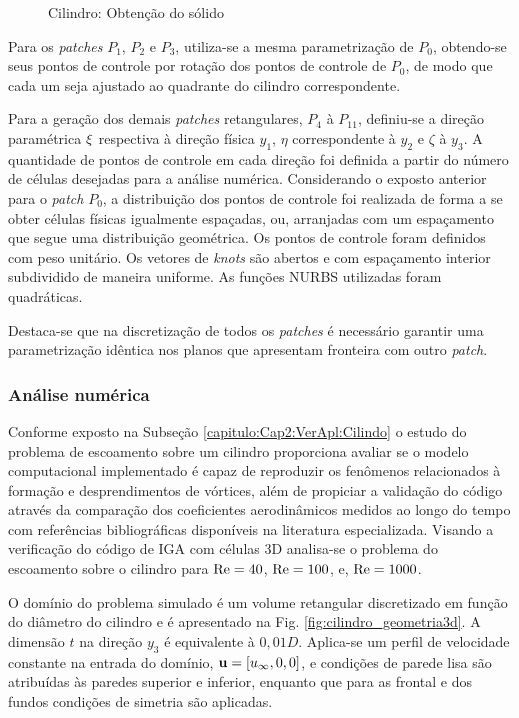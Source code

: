 \documentclass[tese_patricia]{subfiles}
\begin{document}
\begin{figure}[!t]
	\caption{Cilindro: Obtenção do sólido}
	\label{fig:cilindro_geo2}
\end{figure}

Para os \textit{patches} $P_1$, $P_2$ e $P_3$, utiliza-se a mesma parametrização de $P_0$, obtendo-se seus pontos de controle por rotação dos pontos de controle de $P_0$, de modo que cada um seja ajustado ao quadrante do cilindro correspondente.

Para a geração dos demais \textit{patches} retangulares, $P_4$ à $P_{11}$, definiu-se a direção paramétrica $\xi$ respectiva à direção física $y_1$, $\eta$ correspondente à $y_2$ e $\zeta$ à $y_3$. A quantidade de pontos de controle em cada direção foi definida a partir do número de células desejadas para a análise numérica. Considerando o exposto anterior para o \textit{patch} $P_0$, a distribuição dos pontos de controle foi realizada de forma a se obter células físicas igualmente espaçadas, ou, arranjadas com um espaçamento que segue uma distribuição geométrica. Os pontos de controle foram definidos com peso unitário. Os vetores de \textit{knots} são abertos e com espaçamento interior subdividido de maneira uniforme. As funções NURBS utilizadas foram quadráticas. 

Destaca-se que na discretização de todos os \textit{patches} é necessário garantir uma parametrização idêntica nos planos que apresentam fronteira com outro \textit{patch}.


\subsubsection {Análise numérica}

Conforme exposto na Subseção \ref{capitulo:Cap2:VerApl:Cilindo} o estudo do problema de escoamento sobre um cilindro proporciona avaliar se o modelo computacional implementado é capaz de reproduzir os fenômenos relacionados à formação e desprendimentos de vórtices, além de propiciar a validação do código através da comparação dos coeficientes aerodinâmicos medidos ao longo do tempo com referências bibliográficas disponíveis na literatura especializada. Visando a verificação do código de IGA com células 3D analisa-se o problema do escoamento sobre o cilindro para $\mathrm{Re} = 40$, $\mathrm{Re} = 100$, e, $\mathrm{Re} = 1000$.

O domínio do problema simulado é um volume retangular discretizado em função do diâmetro do cilindro e é apresentado na Fig. \ref{fig:cilindro_geometria3d}. A dimensão $t$ na direção $y_3$ é equivalente à $0,01D$. Aplica-se um perfil de velocidade constante na entrada do domínio, $\mathbf{u}=[u_\infty,0,0]$, e condições de parede lisa são atribuídas às paredes superior e inferior, enquanto que para as frontal e dos fundos condições de simetria são aplicadas.
\end{document}
